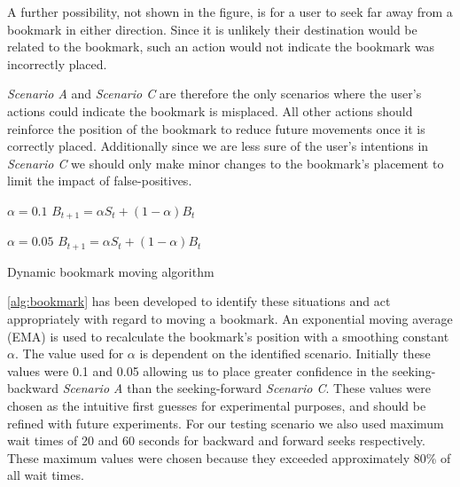 A further possibility, not shown in the figure, is for a user to seek far away from a bookmark in either direction. Since it is unlikely their destination would be related to the bookmark, such an action would not indicate the bookmark was incorrectly placed.

\emph{Scenario A} and \emph{Scenario C} are therefore the only scenarios where the user's actions could indicate the bookmark is misplaced. All other actions should reinforce the position of the bookmark to reduce future movements once it is correctly placed. Additionally since we are less sure of the user's intentions in \emph{Scenario C} we should only make minor changes to the bookmark's placement to limit the impact of false-positives.

\renewcommand{\algorithmiccomment}[1]{// #1}
\begin{algorithm}[t]
{\small
\begin{algorithmic}[0]
    \STATE{}
    \STATE{}
    \STATE{}
        \STATE{}
            \STATE{}
            \STATE $\alpha = 0.1$
            \STATE $B_{t+1} = \alpha S_{t} + (1-\alpha) B_{t}$
        \ENDIF

        \STATE{}
            \STATE{}
            \STATE $\alpha = 0.05$
            \STATE $B_{t+1} = \alpha S_{t} + (1-\alpha) B_{t}$
        \ENDIF
    \ENDIF
\end{algorithmic}
}
\caption{Dynamic bookmark moving algorithm}
\label{alg:bookmark}
\end{algorithm}

\autoref{alg:bookmark} has been developed to identify these situations and act appropriately with regard to moving a bookmark. An exponential moving average (EMA) is used to recalculate the bookmark's position with a smoothing constant $\alpha$. The value used for $\alpha$ is dependent on the identified scenario. Initially these values were 0.1 and 0.05 allowing us to place greater confidence in the seeking-backward \emph{Scenario A} than the seeking-forward \emph{Scenario C}. These values were chosen as the intuitive first guesses for experimental purposes, and should be refined with future experiments. For our testing scenario we also used maximum wait times of 20 and 60 seconds for backward and forward seeks respectively. These maximum values were chosen because they exceeded approximately 80\% of all wait times.

